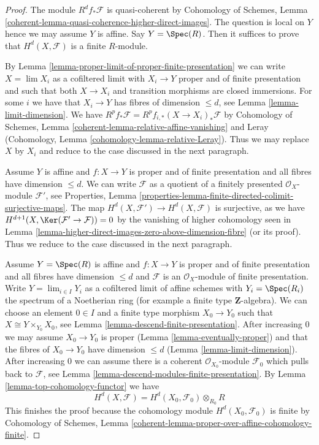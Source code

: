 \begin{proof}
The module $R^df_*\mathcal{F}$ is quasi-coherent by
Cohomology of Schemes, Lemma
\ref{coherent-lemma-quasi-coherence-higher-direct-images}.
The question is local on $Y$ hence we may assume $Y$ is affine.
Say $Y = \Spec(R)$. Then it suffices to prove that $H^d(X, \mathcal{F})$
is a finite $R$-module.

\medskip\noindent
By Lemma \ref{lemma-proper-limit-of-proper-finite-presentation}
we can write $X = \lim X_i$ as a cofiltered limit with $X_i \to Y$ proper
and of finite presentation and such that both $X \to X_i$
and transition morphisms are closed immersions.
For some $i$ we have that $X_i \to Y$ has fibres of dimension $\leq d$,
see Lemma \ref{lemma-limit-dimension}. We have
$R^pf_*\mathcal{F} = R^pf_{i, *}(X \to X_i)_*\mathcal{F}$ by
Cohomology of Schemes, Lemma \ref{coherent-lemma-relative-affine-vanishing}
and Leray (Cohomology, Lemma \ref{cohomology-lemma-relative-Leray}).
Thus we may replace $X$ by $X_i$ and
reduce to the case discussed in the next paragraph.

\medskip\noindent
Assume $Y$ is affine and $f : X \to Y$ is proper and of finite presentation
and all fibres have dimension $\leq d$.
We can write $\mathcal{F}$ as a quotient of a finitely presented
$\mathcal{O}_X$-module $\mathcal{F}'$, see
Properties, Lemma
\ref{properties-lemma-finite-directed-colimit-surjective-maps}.
The map $H^d(X, \mathcal{F}') \to H^d(X, \mathcal{F})$ is
surjective, as we have $H^{d + 1}(X, \Ker(\mathcal{F}' \to \mathcal{F})) = 0$
by the vanishing of higher cohomology seen in
Lemma \ref{lemma-higher-direct-images-zero-above-dimension-fibre}
(or its proof). Thus we reduce to the case discussed in the next paragraph.

\medskip\noindent
Assume $Y = \Spec(R)$ is affine and $f : X \to Y$
is proper and of finite presentation
and all fibres have dimension $\leq d$ and $\mathcal{F}$ is an
$\mathcal{O}_X$-module of finite presentation.
Write $Y = \lim_{i \in I} Y_i$ as a cofiltered limit of affine schemes
with $Y_i = \Spec(R_i)$ the spectrum of a Noetherian ring
(for example a finite type $\mathbf{Z}$-algebra).
We can choose an element $0 \in I$ and a finite type morphism
$X_0 \to Y_0$ such that $X \cong Y \times_{Y_0} X_0$, see
Lemma \ref{lemma-descend-finite-presentation}.
After increasing $0$ we may assume $X_0 \to Y_0$ is proper
(Lemma \ref{lemma-eventually-proper})
and that the fibres of $X_0 \to Y_0$ have dimension $\leq d$
(Lemma \ref{lemma-limit-dimension}).
After increasing $0$ we can assume there is a coherent
$\mathcal{O}_{X_0}$-module $\mathcal{F}_0$ which pulls
back to $\mathcal{F}$, see
Lemma \ref{lemma-descend-modules-finite-presentation}.
By Lemma \ref{lemma-top-cohomology-functor}
we have
$$
H^d(X, \mathcal{F}) = H^d(X_0, \mathcal{F}_0) \otimes_{R_0} R
$$
This finishes the proof because the cohomology module
$H^d(X_0, \mathcal{F}_0)$ is finite by
Cohomology of Schemes, Lemma
\ref{coherent-lemma-proper-over-affine-cohomology-finite}.
\end{proof}

